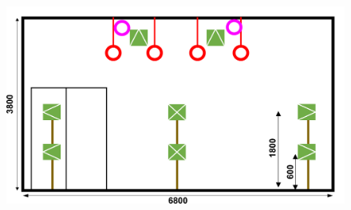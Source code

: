\documentclass[11pt,a4j]{jreport}
\begin{document}
    \begin{figure}[H]
      \begin{minipage}[b]{1\linewidth}
          \centering
          \includegraphics[width=.6\linewidth]{images/afcEquipArrayVertical.png}
          \label{fig:AFC機器配置断面図}
      \end{minipage}
  

\end{figure}
\end{document}
